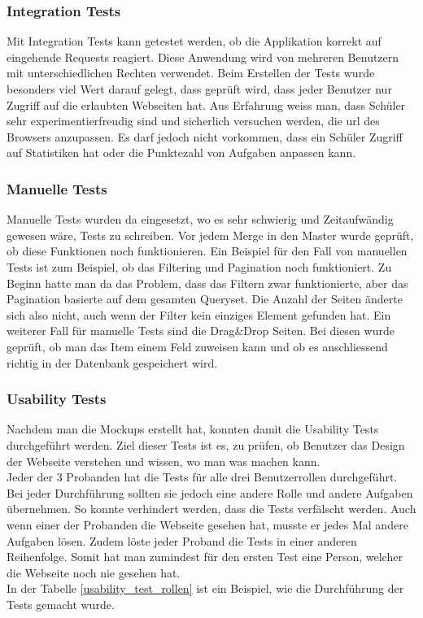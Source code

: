\subsubsection{Integration Tests}
Mit Integration Tests kann getestet werden, ob die Applikation korrekt auf eingehende Requests reagiert. Diese Anwendung wird von mehreren Benutzern mit unterschiedlichen Rechten verwendet. Beim Erstellen der Tests wurde besonders viel Wert darauf gelegt, dass geprüft wird, dass jeder Benutzer nur Zugriff auf die erlaubten Webseiten hat. Aus Erfahrung weiss man, dass Schüler sehr experimentierfreudig sind und sicherlich versuchen werden, die \gls{url} des Browsers anzupassen. Es darf jedoch nicht vorkommen, dass ein Schüler Zugriff auf Statistiken hat oder die Punktezahl von Aufgaben anpassen kann.


\subsubsection{Manuelle Tests}
Manuelle Tests wurden da eingesetzt, wo es sehr schwierig und Zeitaufwändig gewesen wäre, Tests zu schreiben. Vor jedem Merge in den Master wurde geprüft, ob diese Funktionen noch funktionieren. Ein Beispiel für den Fall von manuellen Tests ist zum Beispiel, ob das Filtering und Pagination noch funktioniert. Zu Beginn hatte man da das Problem, dass das Filtern zwar funktionierte, aber das Pagination basierte auf dem gesamten Queryset. Die Anzahl der Seiten änderte sich also nicht, auch wenn der Filter kein einziges Element gefunden hat. Ein weiterer Fall für manuelle Tests sind die Drag\&Drop Seiten. Bei diesen wurde geprüft, ob man das Item einem Feld zuweisen kann und ob es anschliessend richtig in der Datenbank gespeichert wird. \\


\subsubsection{Usability Tests}
Nachdem man die Mockups erstellt hat, konnten damit die Usability Tests durchgeführt werden. Ziel dieser Tests ist es, zu prüfen, ob Benutzer das Design der Webseite verstehen und wissen, wo man was machen kann. \\

Jeder der 3 Probanden hat die Tests für alle drei Benutzerrollen durchgeführt. Bei jeder Durchführung sollten sie jedoch eine andere Rolle und andere Aufgaben übernehmen. So konnte verhindert werden, dass die Tests verfälscht werden. Auch wenn einer der Probanden die Webseite gesehen hat, musste er jedes Mal andere Aufgaben lösen. Zudem löste jeder Proband die Tests in einer anderen Reihenfolge. Somit hat man zumindest für den ersten Test eine Person, welcher die Webseite noch nie gesehen hat. \\
In der Tabelle \ref{usability_test_rollen} ist ein Beispiel, wie die Durchführung der Tests gemacht wurde.

